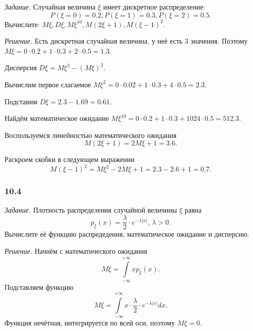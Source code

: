 \textit{Задание.}
Случайная величина $ \xi $ имеет дискретное распределение:
$$P \left( \xi = 0 \right) = 0.2,
P \left( \xi = 1 \right) = 0.3,
P \left( \xi = 2 \right) = 0.5.$$
Вычислите: $M \xi, D \xi, M \xi^{10}, M \left( 2 \xi + 1 \right), M \left( \xi - 1 \right)^2$.

\textit{Решение.} Есть дискретная случайная величина, у неё есть 3 значения.
Поэтому $M \xi = 0 \cdot 0.2 + 1 \cdot 0.3 + 2 \cdot 0.5 = 1.3$.

Дисперсия $D \xi = M \xi^2 - \left( M \xi \right)^2$.

Вычислим первое слагаемое $M \xi^2 = 0 \cdot 0.02 + 1 \cdot 0.3 + 4 \cdot 0.5 = 2.3$.

Подставим $D \xi = 2.3 - 1.69 = 0.61$.

Найдём математическое ожидание $M \xi^{10} = 0 \cdot 0.2 + 1 \cdot 0.3 + 1024 \cdot 0.5 = 512.3$.

Воспользуемся линейностью математического ожидания
$$M \left( 2 \xi + 1 \right) =
2 M \xi + 1 =
3.6.$$

Раскроем скобки в следующем выражении
$$M \left( \xi - 1 \right)^2 =
M \xi^2 - 2 M \xi + 1 =
2.3 - 2.6 + 1 =
0.7.$$

\subsubsection*{10.4}

\textit{Задание.} Плотность распределения случайной величины $ \xi $ равна
$$p_{ \xi } \left( x \right) =
\frac{ \lambda }{2} \cdot e^{- \lambda \left| x \right| }, \, \lambda > 0.$$
Вычислите её функцию распредедения, математическое ожидание и дисперсию.

\textit{Решение.} Начнём с математического ожидания
$$M \xi =
\int \limits_{- \infty }^{+ \infty }xp_{ \xi } \left( x \right).$$
Подставляем функцию
$$M \xi =
\int \limits_{- \infty }^{+ \infty } x \cdot \frac{ \lambda }{2} \cdot e^{- \lambda \left| x \right| } dx.$$
Функция нечётная, интегрируется по всей оси, поэтому $M \xi = 0$.

